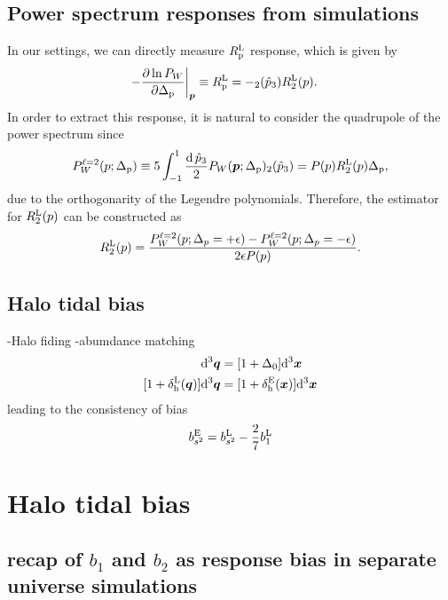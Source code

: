 \documentclass[a4paper,11pt]{article}
\let\L\relax
\DeclareMathOperator{\L}{\mathcal{L}}
\renewcommand{\d}{\mathrm{d}}
\newcommand{\vx}{{\bm x}}
\newcommand{\vq}{{\bm q}}
\newcommand{\vp}{{\bm p}}
\newcommand{\Lagrange}{\mathrm{L}}
\begin{document}
\subsection{Power spectrum responses from simulations}
In our settings, we can directly measure $R^{\rm L}_{\rm p}$ response, which is given by
\begin{align}
-\frac{\partial\ln P_W}{\partial\Delta_{\rm p}} \bigg|_\vp
    &\equiv R^{\rm L}_{\rm p}
    = - \L_2(\hat p_3) R^\Lagrange_2(p).
\end{align}
In order to extract this response, it is natural to consider the quadrupole of the power spectrum since
\begin{align}
P^{\ell=2}_W(p;\Delta_{\rm p}) \equiv
5\int_{-1}^{1} \frac{\d\,\hat p_3}{2} P_W(\vp;\Delta_{\rm p}) \L_2(\hat p_3)
=P(p)R_2^{\rm L}(p)\Delta_{\rm p},
\end{align}
due to the orthogonarity of the Legendre polynomials.
Therefore, the estimator for $R_2^{\rm L}(p)$ can be constructed as
\begin{align}
R_2^{\rm L}(p) = \frac{P_W^{\ell=2}(p;\Delta_p=+\epsilon) - P_W^{\ell=2}(p;\Delta_p=-\epsilon)}{2\epsilon P(p)}.
\end{align}


\subsection{Halo tidal bias}
-Halo fiding
-abumdance matching
\begin{align}
\d^3\vq &= [1+\Delta_0]\d^3\vx
\\
[1+\delta^{\rm L}_{\rm h}(\vq)]\d^3\vq &= [1+\delta^{\rm E}_{\rm h}(\vx)]\d^3\vx
\end{align}
leading to the consistency of bias
\begin{align}
b^{\rm E}_{s^2} = b^{\rm L}_{s^2} -\frac{2}{7}b_1^{\rm L}
\end{align}



\section{Halo tidal bias}
\label{sec:bias}
\subsection{recap of $b_1$ and $b_2$ as response bias in separate universe simulations}
\end{document}

